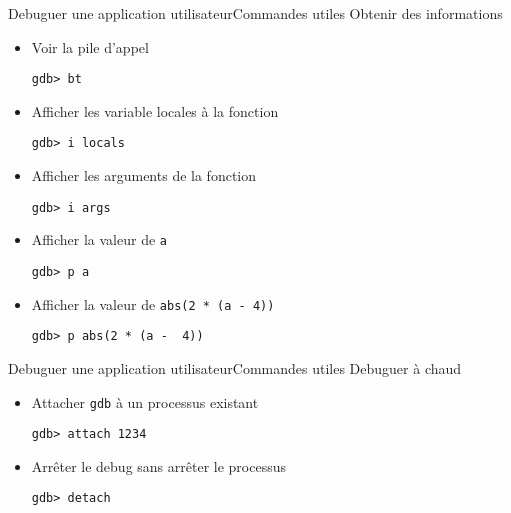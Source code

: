 \begin{frame}[fragile=singleslide]{Debuguer une application utilisateur}{Commandes utiles}
  Obtenir des informations
  \begin{itemize}
  \item Voir la pile d'appel
    \begin{lstlisting}
gdb> bt
    \end{lstlisting}
  \item Afficher les variable locales à la fonction
    \begin{lstlisting}
gdb> i locals
    \end{lstlisting}
  \item Afficher les arguments de la fonction
    \begin{lstlisting}
gdb> i args
    \end{lstlisting}
  \item Afficher la valeur de \verb+a+
    \begin{lstlisting}
gdb> p a
    \end{lstlisting}
  \item Afficher la valeur de \verb+abs(2 * (a - 4))+
    \begin{lstlisting}
gdb> p abs(2 * (a -  4))
    \end{lstlisting}
  \end{itemize}
\end{frame}

\begin{frame}[fragile=singleslide]{Debuguer une application utilisateur}{Commandes utiles}
  Debuguer à chaud
  \begin{itemize}
  \item Attacher \verb+gdb+ à un processus existant
    \begin{lstlisting}
gdb> attach 1234
    \end{lstlisting}
  \item Arrêter le debug sans arrêter le processus
    \begin{lstlisting}
gdb> detach
     \end{lstlisting}
   \end{itemize}
\end{frame}

